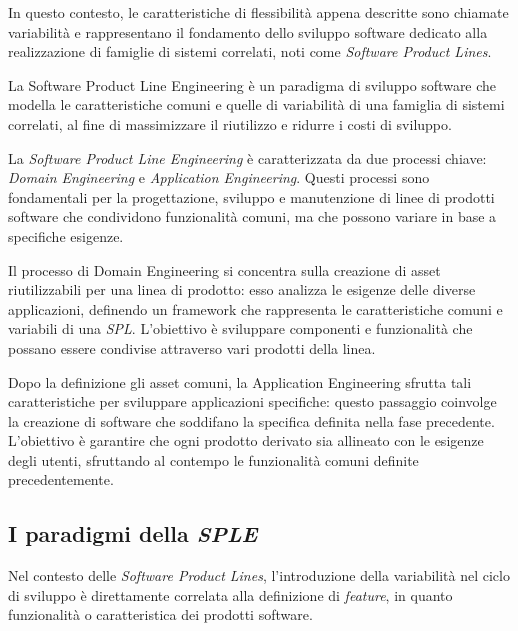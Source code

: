 \documentclass[12pt]{report}
\newcommand{\torevise}[1]{\textcolor{red}{#1}}
\newcommand{\sple}{\textsl{SPLE}\xspace}
\newcommand{\spl}{\textsl{SPL}\xspace}
\begin{document}
In questo contesto, le caratteristiche di flessibilità appena descritte sono chiamate variabilità e rappresentano il fondamento dello sviluppo software dedicato alla realizzazione di famiglie di sistemi correlati, noti come \textit{Software Product Lines}.

\begin{mdframed}
\small
La \textsf{Software Product Line Engineering} è un paradigma di sviluppo software che modella le caratteristiche comuni e quelle di variabilità di una famiglia di sistemi correlati, al fine di massimizzare il riutilizzo e ridurre i costi di sviluppo.
\end{mdframed}

La \textit{Software Product Line Engineering} è caratterizzata da due processi chiave: \textit{Domain Engineering} e \textit{Application Engineering}. Questi processi sono fondamentali per la progettazione, sviluppo e manutenzione di linee di prodotti software che condividono funzionalità comuni, ma che possono variare in base a specifiche esigenze.

Il processo di \textsf{Domain Engineering} si concentra sulla creazione di asset riutilizzabili per una linea di prodotto: esso analizza le esigenze delle diverse applicazioni, definendo un framework che rappresenta le caratteristiche comuni e variabili di una \spl. L'obiettivo è sviluppare componenti e funzionalità che possano essere condivise attraverso vari prodotti della linea.

Dopo la definizione gli asset comuni, la \textsf{Application Engineering} sfrutta tali caratteristiche per sviluppare applicazioni specifiche: questo passaggio coinvolge la creazione di software che soddifano la specifica definita nella fase precedente. L'obiettivo è garantire che ogni prodotto derivato sia allineato con le esigenze degli utenti, sfruttando al contempo le funzionalità comuni definite precedentemente.




\subsection{I paradigmi della \sple}
Nel contesto delle \textit{Software Product Lines}, l'introduzione della variabilità nel ciclo di sviluppo è direttamente correlata alla definizione di \textit{feature}, in quanto funzionalità o caratteristica dei prodotti software.
\end{document}
